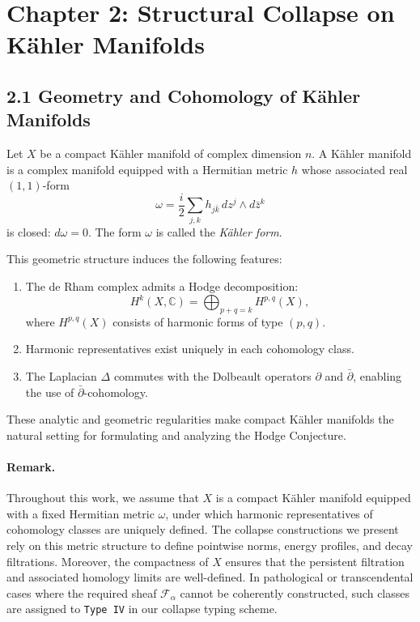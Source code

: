 \documentclass[11pt]{article}
\begin{document}
\section{Chapter 2: Structural Collapse on Kähler Manifolds}

\subsection{2.1 Geometry and Cohomology of Kähler Manifolds}

Let $X$ be a compact Kähler manifold of complex dimension $n$. A Kähler manifold is a complex manifold equipped with a Hermitian metric $h$ whose associated real $(1,1)$-form
\[
\omega = \frac{i}{2} \sum_{j,k} h_{j\bar{k}}\, dz^j \wedge d\bar{z}^k
\]
is closed: $d\omega = 0$. The form $\omega$ is called the \emph{Kähler form}.

This geometric structure induces the following features:
\begin{enumerate}
  \item The de Rham complex admits a Hodge decomposition:
  \[
  H^k(X, \mathbb{C}) = \bigoplus_{p+q=k} H^{p,q}(X),
  \]
  where $H^{p,q}(X)$ consists of harmonic forms of type $(p,q)$.
  \item Harmonic representatives exist uniquely in each cohomology class.
  \item The Laplacian $\Delta$ commutes with the Dolbeault operators $\partial$ and $\bar{\partial}$, enabling the use of $\bar{\partial}$-cohomology.
\end{enumerate}

These analytic and geometric regularities make compact Kähler manifolds the natural setting for formulating and analyzing the Hodge Conjecture.

\paragraph{Remark.}
Throughout this work, we assume that $X$ is a compact Kähler manifold equipped with a fixed Hermitian metric $\omega$, under which harmonic representatives of cohomology classes are uniquely defined. The collapse constructions we present rely on this metric structure to define pointwise norms, energy profiles, and decay filtrations. Moreover, the compactness of $X$ ensures that the persistent filtration and associated homology limits are well-defined. In pathological or transcendental cases where the required sheaf $\mathcal{F}_\alpha$ cannot be coherently constructed, such classes are assigned to \texttt{Type IV} in our collapse typing scheme.
\end{document}
